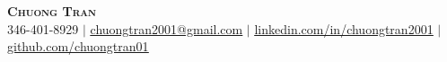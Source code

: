 \begin{center}
	\textbf{\Huge \scshape Chuong Tran} \\ \vspace{1pt}
	\small 346-401-8929 $|$
    \href{mailto:chuongtran2001@gmail.com}{\underline{chuongtran2001@gmail.com}} $|$
	\href{https://www.linkedin.com/in/chuongtran2001/}{\underline{linkedin.com/in/chuongtran2001}} $|$
	\href{https://github.com/chuongtran01}{\underline{github.com/chuongtran01}}
\end{center}